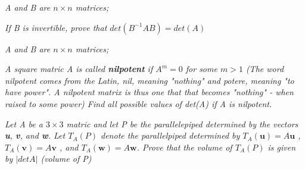 \documentclass[12pt,letterpaper]{hmcpset}
\begin{document}
\begin{solution}
\end{solution}

\newpage



\begin{problem}[4.2.54]
\textit{A and B are $n\times n$ matrices;}
\begin{center}
\textit{If B is invertible, prove that $det (B^{-1}AB)= det(A)$}
\end{center}
\end{problem}

\begin{solution}
\end{solution}

\newpage


\begin{problem}[4.2.56]
\textit{A and B are $n\times n$ matrices;}
\begin{center}
\textit{ A square matric A is called \textbf{nilpotent} if $A^m = 0$ for some $m > 1$ (The word nilpotent comes from the Latin, nil, meaning "nothing" and potere, meaning "to have power". A nilpotent matrix is thus one that that becomes "nothing" - when raised to some power) Find all possible values of det(A) if A is nilpotent.}
\end{center}
\end{problem}

\begin{solution}
\end{solution}

\newpage


\begin{problem}[Exploration 10]

\textit{Let A be a $3\times3$ matric and let P be the parallelepiped determined by the vectors \textbf{u}, \textbf{v}, and \textbf{w}. Let $T_A(P)$ denote the parallelpiped determined by $T_A(\textbf{u})= A\textbf{u}$ , $T_A(\textbf{v})= A\textbf{v}$ , and $T_A(\textbf{w})= A\textbf{w}$. Prove that the volume of $T_A(P)$ is given by $| det A|$ (volume of P)}
\end{problem}
\begin{solution}
\end{solution}

\newpage
\end{document}
